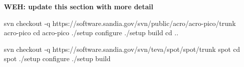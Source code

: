 {\bf WEH: update this section with more detail}

svn checkout -q https://software.sandia.gov/svn/public/acro/acro-pico/trunk acro-pico 
cd acro-pico 
./setup configure 
./setup build 
cd ..

svn checkout -q https://software.sandia.gov/svn/teva/spot/spot/trunk spot 
cd spot 
./setup configure 
./setup build

